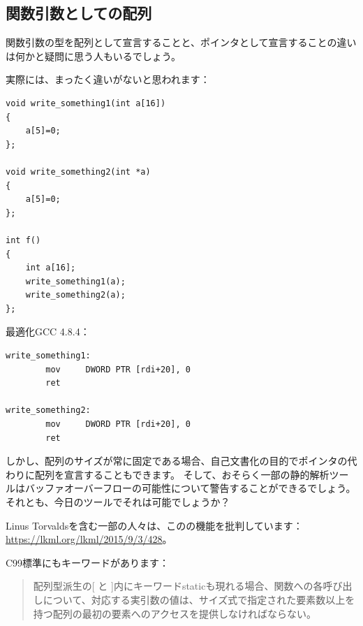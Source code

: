 \subsection{関数引数としての配列}

関数引数の型を配列として宣言することと、ポインタとして宣言することの違いは何かと疑問に思う人もいるでしょう。

実際には、まったく違いがないと思われます：

\begin{lstlisting}[style=customc]
void write_something1(int a[16])
{
	a[5]=0;
};

void write_something2(int *a)
{
	a[5]=0;
};

int f()
{
	int a[16];
	write_something1(a);
	write_something2(a);
};
\end{lstlisting}

最適化GCC 4.8.4：

\begin{lstlisting}[style=customasmx86]
write_something1:
        mov     DWORD PTR [rdi+20], 0
        ret

write_something2:
        mov     DWORD PTR [rdi+20], 0
        ret
\end{lstlisting}

しかし、配列のサイズが常に固定である場合、自己文書化の目的でポインタの代わりに配列を宣言することもできます。
そして、おそらく一部の静的解析ツールはバッファオーバーフローの可能性について警告することができるでしょう。
それとも、今日のツールでそれは可能でしょうか？

Linus Torvaldsを含む一部の人々は、この\CCpp{}の機能を批判しています：\url{https://lkml.org/lkml/2015/9/3/428}。

C99標準にもキーワードがあります：

\begin{framed}
\begin{quotation}
配列型派生の[ と ]内にキーワードstaticも現れる場合、関数への各呼び出しについて、対応する実引数の値は、サイズ式で指定された要素数以上を持つ配列の最初の要素へのアクセスを提供しなければならない。
\end{quotation}
\end{framed}
